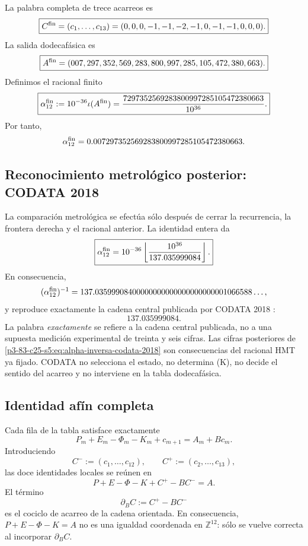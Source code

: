 La palabra completa de trece acarreos es
\[
 \boxed{
 C^{\rm fin}
 =(c_1,\ldots,c_{13})
 =(0,0,0,-1,-1,-2,-1,0,-1,-1,0,0,0).}
\]
La salida dodecafásica es
\[
 \boxed{
 A^{\rm fin}
 =(007,297,352,569,283,800,997,285,105,472,380,663).}
\]
Definimos el racional finito
\begin{equation}
 \boxed{
 \alpha_{12}^{\rm fin}
 :=10^{-36}\iota(A^{\rm fin})
 =\frac{7297352569283800997285105472380663}{10^{36}}.}
 \label{p3-83-c25-s5:eq:alpha-finita-autonoma}
\end{equation}
Por tanto,
\[
 \alpha_{12}^{\rm fin}
 =0.007297352569283800997285105472380663.
\]

\subsection{Reconocimiento metrológico posterior: CODATA 2018}

La comparación metrológica se efectúa sólo después de cerrar la recurrencia,
la frontera derecha y el racional anterior. La identidad entera da
\begin{equation}
 \boxed{
 \alpha_{12}^{\rm fin}
 =10^{-36}
 \left\lfloor\frac{10^{36}}{137.035999084}\right\rfloor.}
 \label{p3-83-c25-s5:eq:alpha-finita-codata-2018}
\end{equation}
En consecuencia,
\begin{equation}
 (\alpha_{12}^{\rm fin})^{-1}
 =137.03599908400000000000000000000001066588\ldots,
 \label{p3-83-c25-s5:eq:alpha-inversa-codata-2018}
\end{equation}
y reproduce exactamente la cadena central publicada por CODATA 2018
\cite{Tiesinga2021CODATA}:
\[
 \boxed{137.035999084.}
\]
La palabra \emph{exactamente} se refiere a la cadena central publicada, no
a una supuesta medición experimental de treinta y seis cifras. Las cifras
posteriores de \eqref{p3-83-c25-s5:eq:alpha-inversa-codata-2018} son consecuencias del
racional HMT ya fijado. CODATA no selecciona el estado, no determina (K),
no decide el sentido del acarreo y no interviene en la tabla dodecafásica.

\subsection{Identidad afín completa}

Cada fila de la tabla satisface exactamente
\begin{equation}
 P_m+E_m-\Phi_m-K_m+c_{m+1}
 =A_m+Bc_m.
 \label{p3-83-c25-s5:eq:identidad-local-acarreo-alpha}
\end{equation}
Introduciendo
\[
 C^-:=(c_1,\ldots,c_{12}),
 \qquad
 C^+:=(c_2,\ldots,c_{13}),
\]
las doce identidades locales se reúnen en
\begin{equation}
 \boxed{
 P+E-\Phi-K+C^+-BC^-=A.}
 \label{p3-83-c25-s5:eq:identidad-afin-vectorial-alpha}
\end{equation}
El término
\[
 \partial_BC:=C^+-BC^-
\]
es el cociclo de acarreo de la cadena orientada. En consecuencia,
\(P+E-\Phi-K=A\) no es una igualdad coordenada en
\(\mathbb Z^{12}\): sólo se vuelve correcta al incorporar
\(\partial_BC\).

